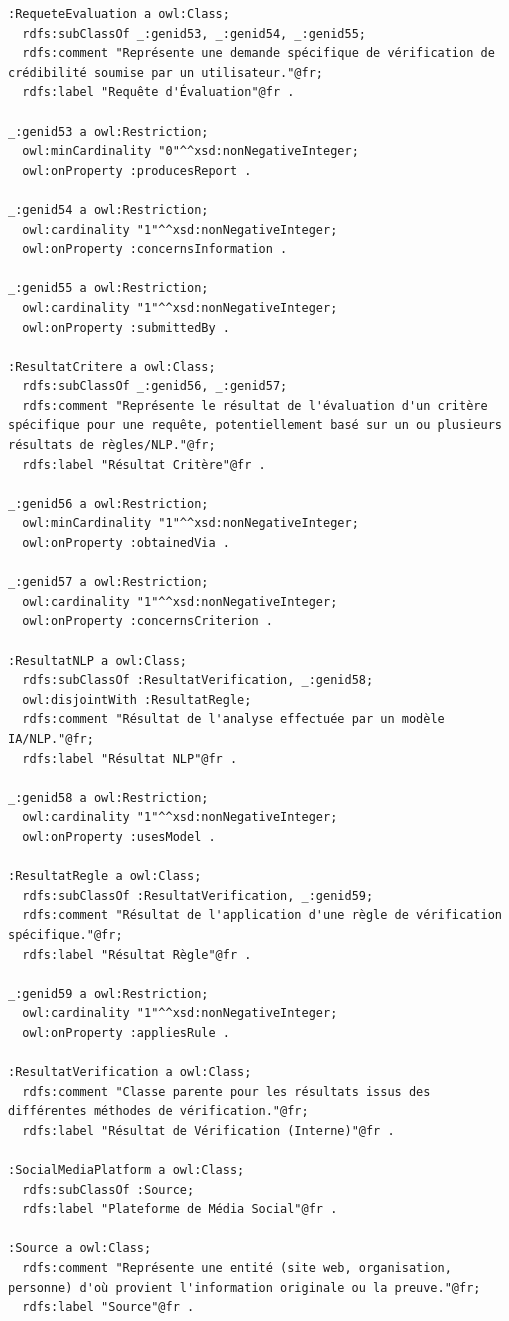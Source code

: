 \documentclass[9pt,twocolumn,twoside,french]{article}
\begin{document}
\begin{lstlisting}[language=Turtle,basicstyle=\ttfamily\tiny,frame=single]
:RequeteEvaluation a owl:Class;
  rdfs:subClassOf _:genid53, _:genid54, _:genid55;
  rdfs:comment "Représente une demande spécifique de vérification de crédibilité soumise par un utilisateur."@fr;
  rdfs:label "Requête d'Évaluation"@fr .

_:genid53 a owl:Restriction;
  owl:minCardinality "0"^^xsd:nonNegativeInteger;
  owl:onProperty :producesReport .

_:genid54 a owl:Restriction;
  owl:cardinality "1"^^xsd:nonNegativeInteger;
  owl:onProperty :concernsInformation .

_:genid55 a owl:Restriction;
  owl:cardinality "1"^^xsd:nonNegativeInteger;
  owl:onProperty :submittedBy .

:ResultatCritere a owl:Class;
  rdfs:subClassOf _:genid56, _:genid57;
  rdfs:comment "Représente le résultat de l'évaluation d'un critère spécifique pour une requête, potentiellement basé sur un ou plusieurs résultats de règles/NLP."@fr;
  rdfs:label "Résultat Critère"@fr .

_:genid56 a owl:Restriction;
  owl:minCardinality "1"^^xsd:nonNegativeInteger;
  owl:onProperty :obtainedVia .

_:genid57 a owl:Restriction;
  owl:cardinality "1"^^xsd:nonNegativeInteger;
  owl:onProperty :concernsCriterion .

:ResultatNLP a owl:Class;
  rdfs:subClassOf :ResultatVerification, _:genid58;
  owl:disjointWith :ResultatRegle;
  rdfs:comment "Résultat de l'analyse effectuée par un modèle IA/NLP."@fr;
  rdfs:label "Résultat NLP"@fr .

_:genid58 a owl:Restriction;
  owl:cardinality "1"^^xsd:nonNegativeInteger;
  owl:onProperty :usesModel .

:ResultatRegle a owl:Class;
  rdfs:subClassOf :ResultatVerification, _:genid59;
  rdfs:comment "Résultat de l'application d'une règle de vérification spécifique."@fr;
  rdfs:label "Résultat Règle"@fr .

_:genid59 a owl:Restriction;
  owl:cardinality "1"^^xsd:nonNegativeInteger;
  owl:onProperty :appliesRule .

:ResultatVerification a owl:Class;
  rdfs:comment "Classe parente pour les résultats issus des différentes méthodes de vérification."@fr;
  rdfs:label "Résultat de Vérification (Interne)"@fr .

:SocialMediaPlatform a owl:Class;
  rdfs:subClassOf :Source;
  rdfs:label "Plateforme de Média Social"@fr .

:Source a owl:Class;
  rdfs:comment "Représente une entité (site web, organisation, personne) d'où provient l'information originale ou la preuve."@fr;
  rdfs:label "Source"@fr .


\end{lstlisting}
\end{document}
